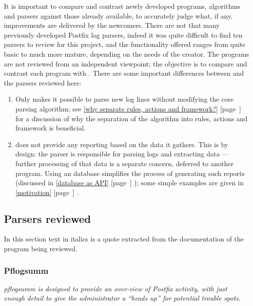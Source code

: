 \documentclass[a4paper,12pt,draft]{article}
\newcommand{\parsername}{\PLP{}}
\newcommand{\refwithpage}[1]{%
    \empty{}\ref{#1} [page~\pageref{#1}]%
}
\newcommand{\sectionref}[1]{%
    \textsection{}\refwithpage{#1}%
}
\begin{document}
It is important to compare and contrast newly developed programs,
algorithms and parsers against those already available, to accurately judge
what, if any, improvements are delivered by the newcomers.  There are not
that many previously developed Postfix log parsers, indeed it was quite
difficult to find ten parsers to review for this project, and the
functionality offered ranges from quite basic to much more mature,
depending on the needs of the creator.  The programs are not reviewed from
an independent viewpoint; the objective is to compare and contrast each
program with \parsername{}.  There are some important differences between
\parsername{} and the parsers reviewed here:

\begin{enumerate}

    \item Only \parsername{} makes it possible to parse new log lines
        without modifying the core parsing algorithm; see \sectionref{why
        separate rules, actions and framework?} for a discussion of why the
        separation of the algorithm into rules, actions and framework is
        beneficial.

    \item \parsername{} does not provide any reporting based on the data it
        gathers.  This is by design: the parser is responsible for parsing
        logs and extracting data --- further processing of that data is a
        separate concern, deferred to another program.  Using an \SQL{}
        database simplifies the process of generating such reports
        (discussed in \sectionref{database as API}); some
        simple examples are given in \sectionref{motivation}.

\end{enumerate}

\subsection{Parsers reviewed}

In this section text in italics is a quote extracted from the documentation
of the program being reviewed.


\subsubsection{Pflogsumm}

\textit{pflogsumm is designed to provide an over-view of Postfix activity,
with just enough detail to give the administrator a ``heads up'' for
potential trouble spots.\/}
\end{document}
